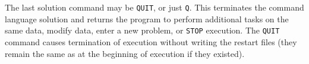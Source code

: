 \headb

The last solution command may be {\tt QUIT},  or  just {\tt Q}.
This  terminates the command language solution and returns the program
to perform  additional
tasks on the same data, modify data, enter a new problem, or {\tt STOP}
execution.  The {\tt QUIT} command causes termination of execution
without writing the restart files (they remain the same as
at the beginning of execution if they existed).
\vfill\eject

